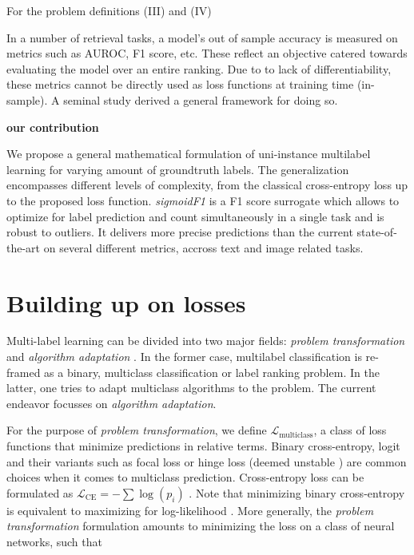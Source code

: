 \documentclass[sigconf,natbib,screen=true,review=true,anonymous]{acmart}
\begin{document}
For the problem definitions (III) and (IV)


In a number of retrieval tasks, a model's out of sample accuracy is measured on metrics such as AUROC, F1 score, etc. These reflect an objective catered towards evaluating the model over an entire ranking. Due to to lack of differentiability, these metrics cannot be directly used as loss functions at training time (in-sample). A seminal study \cite{optimizableLosses} derived a general framework for doing so. 

\textbf{\textbf{our contribution}}

We propose a general mathematical formulation of uni-instance multilabel learning for varying amount of groundtruth labels. The generalization encompasses different levels of complexity, from the classical cross-entropy loss up to the proposed loss function. \emph{sigmoidF1} is a F1 score surrogate which allows to optimize for label prediction and count simultaneously in a single task and is robust to outliers. It delivers more precise predictions than the current state-of-the-art on several different metrics, accross text and image related tasks.

\section{Building up on losses}
\label{sec:orge1c380b}

Multi-label learning can be divided into two major fields: \emph{problem transformation} and \emph{algorithm adaptation} \cite{multilabelReview}. In the former case, multilabel classification is re-framed as a binary, multiclass classification or label ranking problem. In the latter, one tries to adapt multiclass algorithms to the problem. The current endeavor focusses on \emph{algorithm adaptation}.


For the purpose of \emph{problem transformation}, we define \(\mathcal{L}_{\text {multiclass}}\), a class of loss functions that minimize predictions in relative terms. Binary cross-entropy, logit and their variants such as focal loss or hinge loss (deemed unstable \cite{focalLoss}) are common choices when it comes to multiclass prediction. Cross-entropy loss can be formulated as \(\mathcal{L}_{\text {CE}}=-\sum \log \left(p_{i}\right)\) . Note that minimizing binary cross-entropy is equivalent to maximizing for log-likelihood \cite[Section 4.3.4]{Bishop}. More generally, the \emph{problem transformation} formulation amounts to minimizing the loss on a class of neural networks, such that
\end{document}

